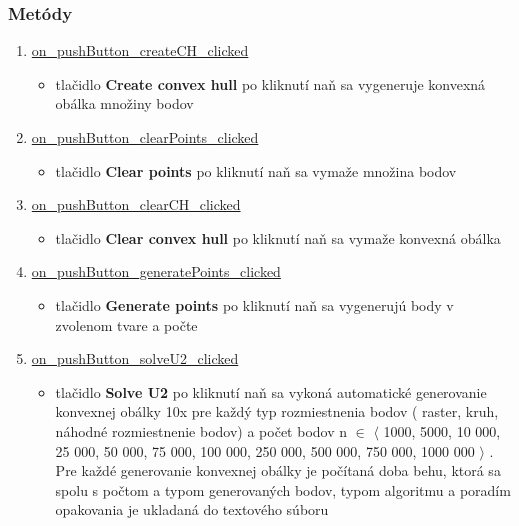\documentclass[12pt]{article}
\begin{document}
\subsubsection{Metódy}
\begin{enumerate}
\item[] \underline{on\_pushButton\_createCH\_clicked}
\begin{itemize}
\item tlačidlo \textbf{Create convex hull} po kliknutí naň sa vygeneruje konvexná obálka množiny bodov
\end{itemize}

\item[] \underline{on\_pushButton\_clearPoints\_clicked}
\begin{itemize}
\item tlačidlo \textbf{Clear points}  po kliknutí naň sa vymaže množina bodov
\end{itemize}

\item[] \underline{on\_pushButton\_clearCH\_clicked}
\begin{itemize}
\item tlačidlo \textbf{Clear convex hull}  po kliknutí naň sa vymaže konvexná obálka
\end{itemize}

\item[] \underline{on\_pushButton\_generatePoints\_clicked}
\begin{itemize}
\item tlačidlo \textbf{Generate points}  po kliknutí naň sa vygenerujú body v zvolenom tvare a počte
\end{itemize}

\item[] \underline{on\_pushButton\_solveU2\_clicked}
\begin{itemize}
\item tlačidlo \textbf{Solve U2}  po kliknutí naň sa vykoná automatické generovanie konvexnej obálky 10x pre každý typ rozmiestnenia bodov ( raster, kruh, náhodné rozmiestnenie bodov) a počet bodov n $\in$ $\langle$ 1000, 5000, 10 000, 25 000, 50 000, 75 000, 100 000, 250 000, 500 000, 750 000, 1000 000 $\rangle$ . Pre každé generovanie konvexnej obálky je počítaná doba behu, ktorá sa spolu s počtom a typom generovaných bodov, typom algoritmu a poradím opakovania je ukladaná do textového súboru
\end{itemize}

\end{enumerate}
\end{document}
